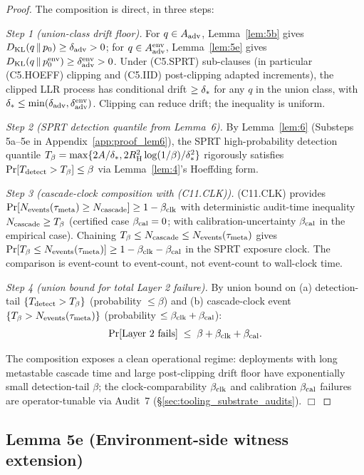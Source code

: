 \begin{proof}
The composition is direct, in three steps:

\emph{Step 1 (union-class drift floor).}  For $q \in A_{\mathrm{adv}}$,
Lemma~\ref{lem:5b} gives $D_{\mathrm{KL}}(q \,\|\, p_0) \geq
\delta_{\mathrm{adv}} > 0$; for $q \in A_{\mathrm{adv}}^{\mathrm{env}}$,
Lemma~\ref{lem:5e} gives $D_{\mathrm{KL}}(q \,\|\, p_0^{\mathrm{env}})
\geq \delta_{\mathrm{adv}}^{\mathrm{env}} > 0$.  Under (C5.SPRT) sub-clauses
(in particular (C5.HOEFF) clipping and (C5.IID) post-clipping
adapted increments), the clipped LLR process has conditional drift
$\geq \delta_{*}$ for any $q$ in the union class, with $\delta_{*}
\leq \min(\delta_{\mathrm{adv}}, \delta_{\mathrm{adv}}^{\mathrm{env}})$.  Clipping can
reduce drift; the inequality is uniform.

\emph{Step 2 (SPRT detection quantile from Lemma~6).}  By
Lemma~\ref{lem:6} (Substeps 5a--5e in
Appendix~\ref{app:proof_lem6}), the SPRT high-probability detection
quantile $T_{\beta} = \max\{2A/\delta_{*}, 2R_{\mathrm{H}}^2 \log(1/\beta) /
\delta_{*}^2\}$ rigorously satisfies $\Pr[T_{\mathrm{detect}} >
T_{\beta}] \leq \beta$ via Lemma~\ref{lem:4}'s Hoeffding form.

\emph{Step 3 (cascade-clock composition with (C11.CLK)).}
(C11.CLK) provides $\Pr[N_{\mathrm{events}}(\tau_{\mathrm{meta}}) \geq N_{\mathrm{cascade}}] \geq 1 - \beta_{\mathrm{clk}}$
    with deterministic audit-time inequality $N_{\mathrm{cascade}} \geq T_{\beta}$ (certified
    case $\beta_{\mathrm{cal}} = 0$; with calibration-uncertainty $\beta_{\mathrm{cal}}$ in the empirical
    case).  Chaining $T_{\beta} \leq N_{\mathrm{cascade}} \leq N_{\mathrm{events}}(\tau_{\mathrm{meta}})$ gives
    $\Pr[T_{\beta} \leq N_{\mathrm{events}}(\tau_{\mathrm{meta}})] \geq 1 - \beta_{\mathrm{clk}} - \beta_{\mathrm{cal}}$ in the
    SPRT exposure clock. The comparison is event-count to event-count, not
    event-count to wall-clock time.

\emph{Step 4 (union bound for total Layer 2 failure).}  By union
bound on (a) detection-tail $\{T_{\mathrm{detect}} > T_{\beta}\}$
(probability $\leq \beta$) and (b) cascade-clock event $\{T_{\beta} >
N_{\mathrm{events}}(\tau_{\mathrm{meta}})\}$ (probability $\leq \beta_{\mathrm{clk}} + \beta_{\mathrm{cal}}$):
\[
  \Pr[\text{Layer 2 fails}] \;\leq\; \beta + \beta_{\mathrm{clk}} + \beta_{\mathrm{cal}}.
\]

The composition exposes a clean operational regime: deployments
with long metastable cascade time and large post-clipping drift
floor have exponentially small detection-tail $\beta$; the
clock-comparability $\beta_{\mathrm{clk}}$ and calibration $\beta_{\mathrm{cal}}$ failures are
operator-tunable via Audit~7
(\S\ref{sec:tooling_substrate_audits}).  $\Box$
\end{proof}

\subsection{Lemma 5e (Environment-side witness extension)}
\label{sec:lem5e}

